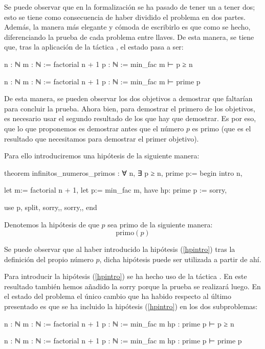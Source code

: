 Se puede observar que en la formalización se ha pasado de tener un
 a tener dos; esto se tiene como consecuencia de
haber dividido el problema en dos partes. Además, la manera más elegante
y cómoda de escribirlo es que como se hecho, diferenciando la prueba de
cada problema entre llaves. De esta manera, se tiene que, tras la
aplicación de la táctica , el estado pasa a ser:
\begin{leancode}
n : ℕ
m : ℕ := factorial n + 1
p : ℕ := min_fac m
⊢ p ≥ n

n : ℕ
m : ℕ := factorial n + 1
p : ℕ := min_fac m
⊢ prime p
\end{leancode}

De esta manera, se pueden observar los dos objetivos a demostrar que faltarían
para concluir la prueba. Ahora bien, para demostrar el primero de los objetivos,
es necesario usar el segundo resultado de los que hay que demostrar. Es por eso,
que lo que proponemos es demostrar antes que el número \(p\) es primo (que es
el resultado que necesitamos para demostrar el primer objetivo).

Para ello introduciremos una hipótesis de la siguiente manera:

\begin{leancode}
theorem infinitos_numeros_primos : ∀ n, ∃ p ≥ n, prime p:=
begin
  intro n,

  let m:= factorial n + 1,
  let p:= min_fac m,
  have hp: prime p := sorry,

  use p,
  split,
  {sorry,},
  {sorry,},
end
\end{leancode}

Denotemos la hipótesis de que \(p\) sea primo de la siguiente manera:
\begin{equation}\tag{hp}\label{hpintro}
  \text{primo}(p)
\end{equation}

Se puede observar que al haber introducido la hipótesis (\ref{hpintro}) tras
la definición del propio número \(p\), dicha hipótesis puede ser utilizada
a partir de ahí.

Para introducir la hipótesis (\ref{hpintro}) se ha hecho uso de la táctica
. En este resultado también hemos añadido la 
{sorry} porque la prueba se realizará luego. En el estado del problema el único
cambio que ha habido respecto al último presentado es que se ha incluido la
hipótesis (\ref{hpintro}) en los dos subproblemas:
\begin{leancode}
n : ℕ
m : ℕ := factorial n + 1
p : ℕ := min_fac m
hp : prime p
⊢ p ≥ n

n : ℕ
m : ℕ := factorial n + 1
p : ℕ := min_fac m
hp : prime p
⊢ prime p
\end{leancode}

